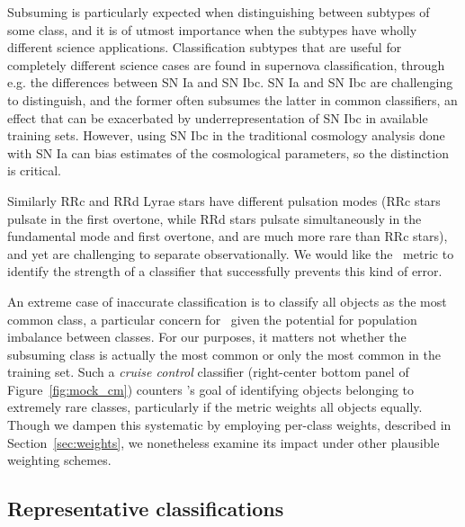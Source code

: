Subsuming is particularly expected when distinguishing between subtypes of some class, and it is of utmost importance when the subtypes have wholly different science applications.
Classification subtypes that are useful for completely different science cases are found in supernova classification, through e.g. the differences between SN Ia and SN Ibc. SN Ia and SN Ibc are challenging to distinguish, and the former often subsumes the latter in common classifiers, an effect that can be exacerbated by underrepresentation of SN Ibc in available training sets.
However, using SN Ibc in the traditional cosmology analysis done with SN Ia can bias estimates of the cosmological parameters, so the distinction is critical.

Similarly RRc and RRd Lyrae stars have different pulsation modes (RRc stars pulsate in the first overtone, while RRd stars pulsate simultaneously in the fundamental mode and first overtone, and are much more rare than RRc stars), and yet are challenging to separate observationally.
We would like the \plasticc\ metric to identify the strength of a classifier that successfully prevents this kind of error.

An extreme case of inaccurate classification is to classify all objects as the most common class, a particular concern for \plasticc\ given the potential for population imbalance between classes.
For our purposes, it matters not whether the subsuming class is actually the most common or only the most common in the training set.
Such a \textit{cruise control} classifier (right-center bottom panel of Figure~\ref{fig:mock_cm}) counters \plasticc's goal of identifying objects belonging to extremely rare classes, particularly if the metric weights all objects equally.
Though we dampen this systematic by employing per-class weights, described in Section~\ref{sec:weights}, we nonetheless examine its impact under other plausible weighting schemes.

%

\subsection{Representative classifications}
\label{sec:realdata}

